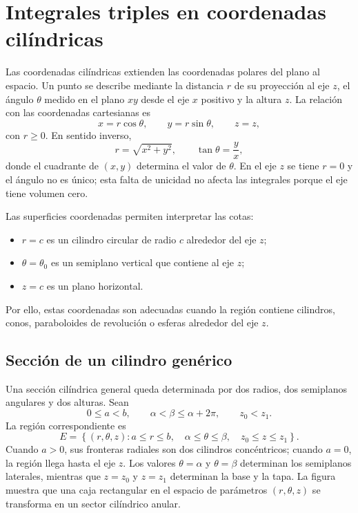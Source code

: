 \section{Integrales triples en coordenadas cilíndricas}

Las coordenadas cilíndricas extienden las coordenadas polares del plano al espacio. Un punto se describe mediante la distancia $r$ de su proyección al eje $z$, el ángulo $\theta$ medido en el plano $xy$ desde el eje $x$ positivo y la altura $z$. La relación con las coordenadas cartesianas es
\[
x=r\cos\theta,\qquad y=r\sin\theta,\qquad z=z,
\]
con $r\geq0$. En sentido inverso,
\[
r=\sqrt{x^2+y^2},\qquad \tan\theta=\frac{y}{x},
\]
donde el cuadrante de $(x,y)$ determina el valor de $\theta$. En el eje $z$ se tiene $r=0$ y el ángulo no es único; esta falta de unicidad no afecta las integrales porque el eje tiene volumen cero.

Las superficies coordenadas permiten interpretar las cotas:
\begin{itemize}
    \item $r=c$ es un cilindro circular de radio $c$ alrededor del eje $z$;
    \item $\theta=\theta_0$ es un semiplano vertical que contiene al eje $z$;
    \item $z=c$ es un plano horizontal.
\end{itemize}
Por ello, estas coordenadas son adecuadas cuando la región contiene cilindros, conos, paraboloides de revolución o esferas alrededor del eje $z$.

\subsection{Sección de un cilindro genérico}

Una sección cilíndrica general queda determinada por dos radios, dos semiplanos angulares y dos alturas. Sean
\[
0\leq a<b,\qquad \alpha<\beta\leq\alpha+2\pi,
\qquad z_0<z_1.
\]
La región correspondiente es
\[
E=\left\{(r,\theta,z):a\leq r\leq b,\quad
\alpha\leq\theta\leq\beta,\quad z_0\leq z\leq z_1\right\}.
\]
Cuando $a>0$, sus fronteras radiales son dos cilindros concéntricos; cuando $a=0$, la región llega hasta el eje $z$. Los valores $\theta=\alpha$ y $\theta=\beta$ determinan los semiplanos laterales, mientras que $z=z_0$ y $z=z_1$ determinan la base y la tapa. La figura muestra que una caja rectangular en el espacio de parámetros $(r,\theta,z)$ se transforma en un sector cilíndrico anular.

